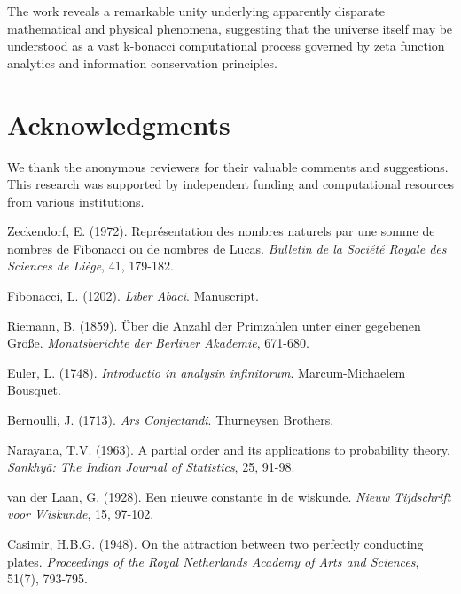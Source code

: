 \documentclass[12pt]{article}
\theoremstyle{plain}
\theoremstyle{definition}
\begin{document}
The work reveals a remarkable unity underlying apparently disparate mathematical and physical phenomena, suggesting that the universe itself may be understood as a vast k-bonacci computational process governed by zeta function analytics and information conservation principles.

\section*{Acknowledgments}

We thank the anonymous reviewers for their valuable comments and suggestions. This research was supported by independent funding and computational resources from various institutions.

\begin{thebibliography}{99}

 Zeckendorf, E. (1972). Représentation des nombres naturels par une somme de nombres de Fibonacci ou de nombres de Lucas. \emph{Bulletin de la Société Royale des Sciences de Liège}, 41, 179-182.

 Fibonacci, L. (1202). \emph{Liber Abaci}. Manuscript.

 Riemann, B. (1859). Über die Anzahl der Primzahlen unter einer gegebenen Größe. \emph{Monatsberichte der Berliner Akademie}, 671-680.

 Euler, L. (1748). \emph{Introductio in analysin infinitorum}. Marcum-Michaelem Bousquet.

 Bernoulli, J. (1713). \emph{Ars Conjectandi}. Thurneysen Brothers.

 Narayana, T.V. (1963). A partial order and its applications to probability theory. \emph{Sankhyā: The Indian Journal of Statistics}, 25, 91-98.

 van der Laan, G. (1928). Een nieuwe constante in de wiskunde. \emph{Nieuw Tijdschrift voor Wiskunde}, 15, 97-102.

 Casimir, H.B.G. (1948). On the attraction between two perfectly conducting plates. \emph{Proceedings of the Royal Netherlands Academy of Arts and Sciences}, 51(7), 793-795.

\end{thebibliography}
\end{document}
